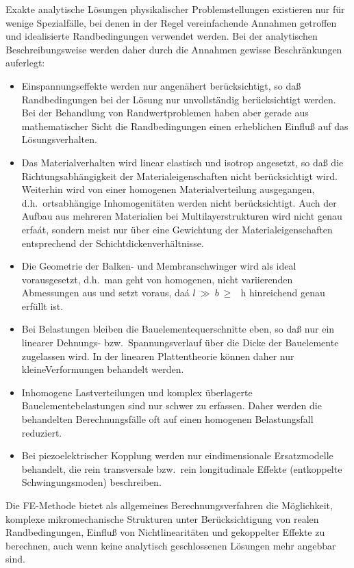 Exakte analytische Lösungen physikalischer Problemstellungen
existieren nur für wenige Spezialfälle, bei denen in der Regel
vereinfachende Annahmen getroffen und idealisierte Randbedingungen
verwendet werden. Bei der analytischen Beschreibungsweise
werden daher durch die Annahmen gewisse Beschränkungen auferlegt:\\
%
\begin{itemize}
\item
Einspannungseffekte werden nur angenähert berücksichtigt, so daß
Randbedingungen bei der Lösung nur unvollständig berücksichtigt werden.
Bei der Behandlung von
Randwertproblemen haben aber gerade aus mathematischer Sicht die
Randbedingungen einen erheblichen Einfluß auf das Lösungsverhalten.
\item
Das Materialverhalten wird linear elastisch und isotrop angesetzt, so daß
die Richtungsabhängigkeit der Materialeigenschaften nicht berücksichtigt
wird. Weiterhin wird von einer homogenen Materialverteilung ausgegangen,
d.h.\ ortsabhängige Inhomogenitäten werden nicht berücksichtigt. Auch der
Aufbau aus mehreren Materialien bei Multilayerstrukturen wird nicht genau
erfaát, sondern meist nur über eine Gewichtung der Materialeigenschaften
entsprechend der Schichtdickenverhältnisse.
\item
Die Geometrie der Balken- und Membranschwinger wird als ideal
vorausgesetzt, d.h.\ man geht von homogenen, nicht variierenden
Abmessungen aus und setzt voraus, daá $l~\gg~b~\geq~$~h hinreichend genau
erfüllt ist.
\item
Bei Belastungen bleiben die Bauelementequerschnitte eben, so daß
nur ein linearer Dehnungs- bzw.\ Spannungsverlauf über die Dicke
der Bauelemente zugelassen wird. In der linearen Plattentheorie
können daher nur \glqq kleine\grqq Verformungen behandelt werden.
\item
Inhomogene Lastverteilungen und komplex überlagerte Bauelementebelastungen
sind nur schwer zu erfassen. Daher werden die behandelten Berechnungsfälle
oft auf einen homogenen Belastungsfall reduziert.
\item
Bei piezoelektrischer Kopplung werden nur eindimensionale
Ersatzmodelle behandelt, die rein transversale bzw.\ rein longitudinale
Effekte (entkoppelte Schwingungsmoden) beschreiben.
\end{itemize}
%
Die FE-Methode bietet als allgemeines Berechnungsverfahren die
Möglichkeit, komplexe mikromechanische Strukturen unter Berücksichtigung
von realen Randbedingungen, Einfluß von Nichtlinearitäten und gekoppelter
Effekte zu berechnen, auch wenn keine analytisch geschlossenen Lösungen
mehr angebbar sind.

